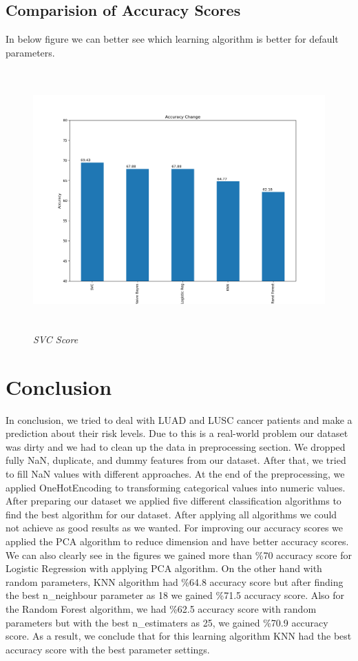 \documentclass[onecolumn]{article}
\begin{document}
\begin{figure}[h]
\begin{minipage}{0.4\textwidth}
    \end{minipage}
\end{figure}

\subsection{Comparision of Accuracy Scores}
In below figure we can better see which learning algorithm is better for default parameters.
\clearpage
\begin{figure}[h]
\includegraphics[width=15cm, height=10cm]{AccuracyChange.png}
\caption{\emph{SVC Score}}
\centering
\end{figure}

\section{Conclusion}
In conclusion, we tried to deal with LUAD and LUSC cancer patients and make a prediction about their risk levels. Due to this is a real-world problem our dataset was dirty and we had to clean up the data in preprocessing section. We dropped fully NaN, duplicate, and dummy features from our dataset. After that, we tried to fill NaN values with different approaches. At the end of the preprocessing, we applied OneHotEncoding to transforming categorical values into numeric values.
After preparing our dataset we applied five different classification algorithms to find the best algorithm for our dataset. After applying all algorithms we could not achieve as good results as we wanted. For improving our accuracy scores we applied the PCA algorithm to reduce dimension and have better accuracy scores. We can also clearly see in the figures we gained more than \%70 accuracy score for Logistic Regression with applying PCA algorithm. 
On the other hand with random parameters, KNN algorithm had \%64.8 accuracy score but after finding the best n\_neighbour parameter as 18 we gained \%71.5 accuracy score. Also for the Random Forest algorithm, we had \%62.5 accuracy score with random parameters but with the best n\_estimaters as 25, we gained \%70.9 accuracy score.
As a result, we conclude that for this learning algorithm KNN had the best accuracy score with the best parameter settings.



\nocite{*}


\end{document}
